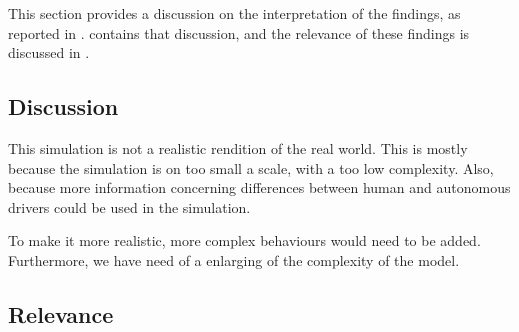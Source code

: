 


This section provides a discussion on the interpretation of the findings, as reported in .  contains that discussion, and the relevance of these findings is discussed in . 

\subsection{Discussion}
\label{sub:conclusion:discussion}




This simulation is not a realistic rendition of the real world. This is mostly because the simulation is on too small a scale, with a too low complexity.
 Also, because more information concerning differences between human and autonomous drivers could be used in the simulation. 

To make it more realistic, more complex behaviours would need to be added. Furthermore, we have need of a enlarging of the complexity of the model.


\subsection{Relevance}
\label{sub:conclusion:relevance}
